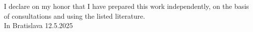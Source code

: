 \thispagestyle{empty}

\newcommand{\signaturespace}[2]{
  \begingroup
  \renewcommand{\arraystretch}{0}
  \begin{tabular}[t]{cc}
  \hspace*{0pt}
  \cleaders\hbox{\kern.6pt.\kern.6pt}\hskip#1\relax
  \hspace*{0pt}
  \\[0.5cm]
  #2
  \end{tabular}
  \endgroup
}

\vspace*{\fill}


I declare on my honor that I have prepared this work independently, on the basis of consultations and using the listed literature. \\

In Bratislava 12.5.2025
\hspace*{\fill} {\myName}


\clearpage